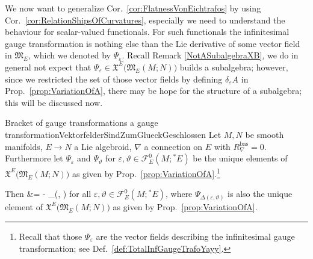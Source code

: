 We now want to generalize Cor.~\ref{cor:FlatnessVonEichtrafos} by using Cor.~\ref{cor:RelationShipsOfCurvatures}, especially we need to understand the behaviour for scalar-valued functionals. For such functionals the infinitesimal gauge transformation is nothing else than the Lie derivative of some vector field in $\mathfrak{M}_E$, which we denoted by $\Psi_\varepsilon$.
Recall Remark \ref{NotASubalgebraXB}, we do in general not expect that $\Psi_\varepsilon \in \mathfrak{X}^E\bigl( \mathfrak{M}_E(M;N) \bigr)$ builds a subalgebra; however, since we restricted the set of those vector fields by defining $\delta_\varepsilon A$ in Prop.~\ref{prop:VariationOfA}, there may be hope for the structure of a subalgebra; this will be discussed now. 

\begin{theorems}{Bracket of gauge transformations a gauge transformation}{VektorfelderSindZumGlueckGeschlossen}
Let $M, N$ be smooth manifolds, $E \to N$ a Lie algebroid, $\nabla$ a connection on $E$ with $R^{\mathrm{bas}}_\nabla=0$. Furthermore let $\Psi_\varepsilon$ and $\Psi_\vartheta$ for $\varepsilon, \vartheta \in \mathcal{F}^0_E(M; {}^*E)$ be the unique elements of $\mathfrak{X}^E\bigl( \mathfrak{M}_E(M;N) \bigr)$ as given by Prop.~\ref{prop:VariationOfA}.\footnote{Recall that those $\Psi_\varepsilon$ are the vector fields describing the infinitesimal gauge transformation; see Def.~\ref{def:TotalInfGaugeTrafoYayy}.}

Then
\ba
\mleft[ \Psi_\varepsilon, \Psi_\vartheta \mright]
&=
- \Psi_{\Delta(\varepsilon, \vartheta)}
\ea
for all $\varepsilon, \vartheta \in \mathcal{F}^0_E(M; {}^*E)$, where $\Psi_{\Delta(\varepsilon, \vartheta)}$ is also the unique element of $\mathfrak{X}^E\bigl( \mathfrak{M}_E(M;N) \bigr)$ as given by Prop.~\ref{prop:VariationOfA}.
\end{theorems}

